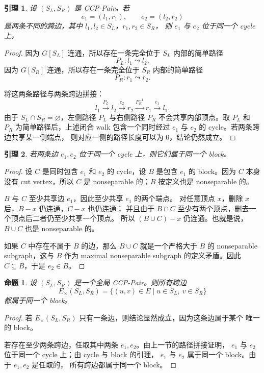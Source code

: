 \documentclass[UTF8]{ctexart}
\newtheorem{lemma}{引理}[section]
\newtheorem{proposition}{命题}[section]
\begin{document}
\begin{lemma}
设 \((S_L,S_R)\) 是 CCP-Pair。若
\[
e_1=(l_1,r_1),\qquad e_2=(l_2,r_2)
\]
是两条不同的跨边，其中 \(l_1,l_2\in S_L\)，\(r_1,r_2\in S_R\)，
则 \(e_1\) 与 \(e_2\) 位于同一个 cycle 上。
\end{lemma}

\begin{proof}
因为 \(G[S_L]\) 连通，所以存在一条完全位于 \(S_L\) 内部的简单路径
\[
P_L:l_1\leadsto l_2.
\]
因为 \(G[S_R]\) 连通，所以存在一条完全位于 \(S_R\) 内部的简单路径
\[
P_R:r_1\leadsto r_2.
\]

将这两条路径与两条跨边拼接：
\[
l_1 \xrightarrow{P_L} l_2
\xrightarrow{e_2} r_2
\xrightarrow{P_R^{-1}} r_1
\xrightarrow{e_1} l_1.
\]
由于 \(S_L\cap S_R=\varnothing\)，左侧路径 \(P_L\) 与右侧路径 \(P_R\)
不会共享内部顶点。取 \(P_L\) 和 \(P_R\) 为简单路径后，上述闭合 walk
包含一个同时经过 \(e_1\) 与 \(e_2\) 的 cycle。若两条跨边共享某一侧端点，
则对应一侧的路径长度可以为 \(0\)，结论仍然成立。
\end{proof}

\begin{lemma}
若两条边 \(e_1,e_2\) 位于同一个 cycle 上，则它们属于同一个 block。
\end{lemma}

\begin{proof}
设 \(C\) 是同时包含 \(e_1\) 和 \(e_2\) 的 cycle，设 \(B\) 是包含
\(e_1\) 的 block。因为 \(C\) 本身没有 cut vertex，所以 \(C\) 是
nonseparable 的；\(B\) 按定义也是 nonseparable 的。

\(B\) 与 \(C\) 至少共享边 \(e_1\)，因此至少共享 \(e_1\) 的两个端点。
对任意顶点 \(x\)，删除 \(x\) 后，\(B-x\) 仍连通，\(C-x\) 也仍连通；
并且由于 \(B\cap C\) 至少有两个顶点，删去一个顶点后二者仍至少共享一个顶点。
所以 \((B\cup C)-x\) 仍连通。也就是说，\(B\cup C\) 也是 nonseparable 的。

如果 \(C\) 中存在不属于 \(B\) 的边，那么 \(B\cup C\) 就是一个严格大于
\(B\) 的 nonseparable subgraph，这与 \(B\) 作为 maximal nonseparable
subgraph 的定义矛盾。因此 \(C\subseteq B\)，于是 \(e_2\in B\)。
\end{proof}

\begin{proposition}
设 \((S_L,S_R)\) 是一个全局 CCP-Pair。则所有跨边
\[
E_\times(S_L,S_R)=\{(u,v)\in E\mid u\in S_L,\ v\in S_R\}
\]
都属于同一个 block。
\end{proposition}

\begin{proof}
若 \(E_\times(S_L,S_R)\) 只有一条边，则结论显然成立，因为这条边属于某个
唯一的 block。

若存在至少两条跨边，任取其中两条 \(e_1,e_2\)。由上一节的路径拼接证明，
\(e_1\) 与 \(e_2\) 位于同一个 cycle 上；由 cycle 与 block 的引理，
\(e_1\) 与 \(e_2\) 属于同一个 block。由于 \(e_1,e_2\) 是任取的，
所有跨边都属于同一个 block。
\end{proof}
\end{document}
